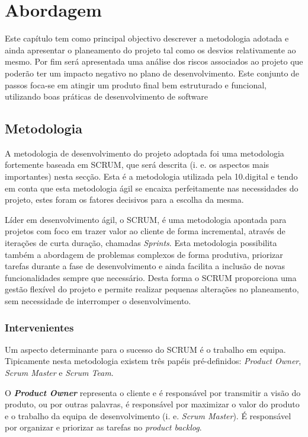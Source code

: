 \chapter{Abordagem}
\label{sec:abordagem}

Este capítulo tem como principal objectivo descrever a metodologia adotada e ainda apresentar o planeamento do projeto tal como os desvios relativamente ao mesmo. Por fim será apresentada uma análise dos riscos associados ao projeto que poderão ter um impacto negativo no plano de desenvolvimento. Este conjunto de passos foca-se em atingir um produto final bem estruturado e funcional, utilizando boas práticas de desenvolvimento de software


\section{Metodologia}
\label{metodologia}

A metodologia de desenvolvimento do projeto adoptada foi uma metodologia fortemente baseada em SCRUM\cite{scrum}, que será descrita (i. e. os aspectos mais importantes) nesta secção. Esta é a metodologia utilizada pela 10.digital e tendo em conta que esta metodologia ágil se encaixa perfeitamente nas necessidades do projeto, estes foram os fatores decisivos para a escolha da mesma. 

Líder em desenvolvimento ágil, o SCRUM, é uma metodologia apontada para projetos com foco em trazer valor ao cliente de forma incremental, através de iterações de curta duração, chamadas \textit{Sprints}. Esta metodologia possibilita também a abordagem de problemas complexos de forma produtiva, priorizar tarefas durante a fase de desenvolvimento e ainda facilita a inclusão de novas funcionalidades sempre que necessário. Desta forma o SCRUM proporciona uma gestão flexível do projeto e permite realizar pequenas alterações no planeamento, sem necessidade de interromper o desenvolvimento.

\subsection{Intervenientes}

Um aspecto determinante para o sucesso do SCRUM é o trabalho em equipa. Tipicamente nesta metodologia existem três papéis pré-definidos: \textit{Product Owner}, \textit{Scrum Master} e \textit{Scrum Team}.

O \textbf{\textit{Product Owner}} representa o cliente e é responsável por transmitir a visão do produto, ou por outras palavras, é responsável por maximizar o valor do produto e o trabalho da equipa de desenvolvimento (i. e. \textit{Scrum Master}). É responsável por organizar e priorizar as tarefas no \textit{product backlog}.

